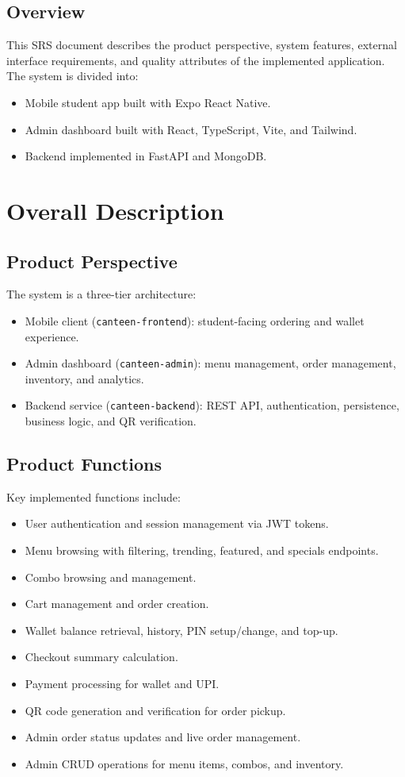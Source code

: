 \documentclass[11pt]{article}
\begin{document}
\subsection{Overview}
This SRS document describes the product perspective, system features, external interface requirements, and quality attributes of the implemented application. The system is divided into:
\begin{itemize}[nosep]
  \item Mobile student app built with Expo React Native.
  \item Admin dashboard built with React, TypeScript, Vite, and Tailwind.
  \item Backend implemented in FastAPI and MongoDB.
\end{itemize}

\section{Overall Description}
\subsection{Product Perspective}
The system is a three-tier architecture:
\begin{itemize}[nosep]
  \item Mobile client (\texttt{canteen-frontend}): student-facing ordering and wallet experience.
  \item Admin dashboard (\texttt{canteen-admin}): menu management, order management, inventory, and analytics.
  \item Backend service (\texttt{canteen-backend}): REST API, authentication, persistence, business logic, and QR verification.
\end{itemize}

\subsection{Product Functions}
Key implemented functions include:
\begin{itemize}[nosep]
  \item User authentication and session management via JWT tokens.
  \item Menu browsing with filtering, trending, featured, and specials endpoints.
  \item Combo browsing and management.
  \item Cart management and order creation.
  \item Wallet balance retrieval, history, PIN setup/change, and top-up.
  \item Checkout summary calculation.
  \item Payment processing for wallet and UPI.
  \item QR code generation and verification for order pickup.
  \item Admin order status updates and live order management.
  \item Admin CRUD operations for menu items, combos, and inventory.
\end{itemize}
\end{document}
